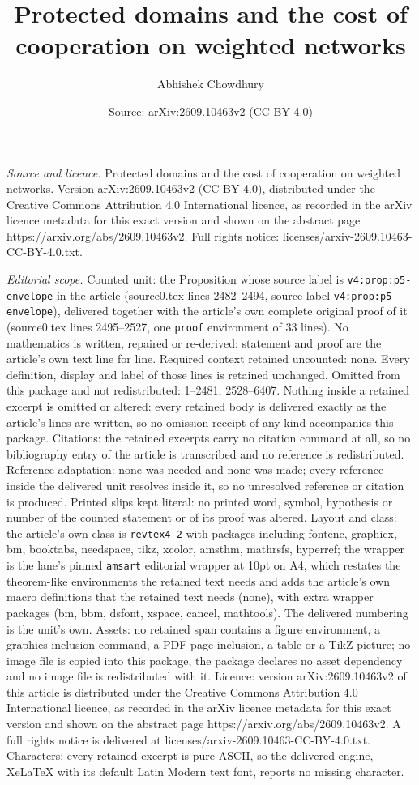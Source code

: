 \documentclass[10pt,a4paper]{amsart}
\title[Protected domains and the cost of cooperation on weighted ne]{Protected domains and the cost of cooperation on weighted networks}
\author{Abhishek Chowdhury}
\date{Source: arXiv:2609.10463v2 (CC BY 4.0)}
\begin{document}
\maketitle

\noindent\emph{Source and licence.} Protected domains and the cost of cooperation on weighted networks. Version arXiv:2609.10463v2 (CC BY 4.0), distributed under the Creative Commons Attribution 4.0 International licence, as recorded in the arXiv licence metadata for this exact version and shown on the abstract page https://arxiv.org/abs/2609.10463v2. Full rights notice: licenses/arxiv-2609.10463-CC-BY-4.0.txt.\par\smallskip

\noindent\textit{Editorial scope.} Counted unit: the Proposition whose source label is \texttt{v4:prop:p5-envelope} in the article (source0.tex lines 2482--2494, source label \texttt{v4:prop:p5-envelope}), delivered together with the article's own complete original proof of it (source0.tex lines 2495--2527, one \texttt{proof} environment of 33 lines). No mathematics is written, repaired or re-derived: statement and proof are the article's own text line for line. Required context retained uncounted: none. Every definition, display and label of those lines is retained unchanged. Omitted from this package and not redistributed: 1--2481, 2528--6407. Nothing inside a retained excerpt is omitted or altered: every retained body is delivered exactly as the article's lines are written, so no omission receipt of any kind accompanies this package. Citations: the retained excerpts carry no citation command at all, so no bibliography entry of the article is transcribed and no reference is redistributed. Reference adaptation: none was needed and none was made; every reference inside the delivered unit resolves inside it, so no unresolved reference or citation is produced. Printed slips kept literal: no printed word, symbol, hypothesis or number of the counted statement or of its proof was altered. Layout and class: the article's own class is \texttt{revtex4-2} with packages including fontenc, graphicx, bm, booktabs, needspace, tikz, xcolor, amsthm, mathrsfs, hyperref; the wrapper is the lane's pinned \texttt{amsart} editorial wrapper at 10pt on A4, which restates the theorem-like environments the retained text needs and adds the article's own macro definitions that the retained text needs (none), with extra wrapper packages (bm, bbm, dsfont, xspace, cancel, mathtools). The delivered numbering is the unit's own. Assets: no retained span contains a figure environment, a graphics-inclusion command, a PDF-page inclusion, a table or a TikZ picture; no image file is copied into this package, the package declares no asset dependency and no image file is redistributed with it. Licence: version arXiv:2609.10463v2 of this article is distributed under the Creative Commons Attribution 4.0 International licence, as recorded in the arXiv licence metadata for this exact version and shown on the abstract page https://arxiv.org/abs/2609.10463v2. A full rights notice is delivered at licenses/arxiv-2609.10463-CC-BY-4.0.txt. Characters: every retained excerpt is pure ASCII, so the delivered engine, XeLaTeX with its default Latin Modern text font, reports no missing character.
\end{document}
